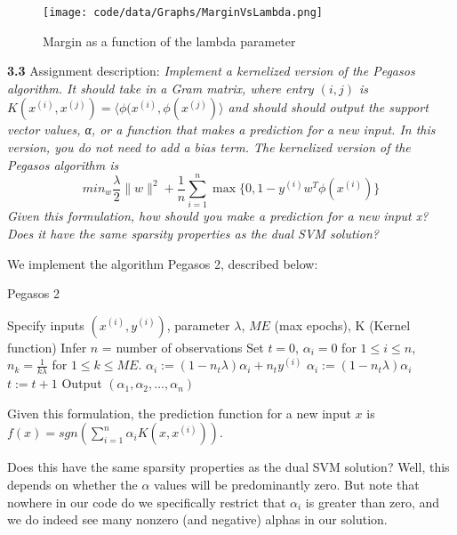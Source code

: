 \documentclass[10pt]{article}
\newcommand{\ds}{\displaystyle}
\begin{document}
\begin{figure}[!ht]
\texttt{[image: code/data/Graphs/MarginVsLambda.png]}
\caption{Margin as a function of the lambda parameter}
\end{figure}

\medskip

\textbf{3.3} Assignment description: \emph{Implement a kernelized version of the Pegasos algorithm. It should take in a Gram matrix, where entry $\ds (i, j)$ is $\ds K(x^{(i)}, x^{(j)}) = \langle\phi(x^{(i)}, \phi(x^{(j)})\rangle$ and should should output the support vector values, α, or a function
that makes a prediction for a new input. In this version, you do not need to add a bias term. The kernelized version of the Pegasos algorithm is $$\ds min_{w} \frac{\lambda}{2}\|w\|^2 + \frac{1}{n}\sum_{i=1}^n\max\{0, 1-y^{(i)}w^T\phi(x^{(i)})\}$$
Given this formulation, how should you make a prediction for a new input x? Does it have the same
sparsity properties as the dual SVM solution?}

We implement the algorithm Pegasos 2, described below:

\begin{algorithm}
\caption{Pegasos 2}
\begin{algorithmic}[1]
\State Specify inputs $\ds (x^{(i)}, y^{(i)}) $, parameter $\ds\lambda$, $\ds ME$ (max epochs), K (Kernel function)
\State Infer $\ds n$ = number of observations
\State Set $\ds t=0$, $\ds \alpha_i=0$ for $\ds 1\leq i\leq n $, $\ds n_k = \frac{1}{k\lambda}$ for $\ds 1\leq k \leq ME$.
\While{$\ds t < ME$}
\If{$\ds y^{(i)}\left(\sum_{j=1}^n \alpha_j K(x^{(j)}, x^{(i)})\right) <1$}
\State $\ds \alpha_i:= (1-n_t\lambda)\alpha_i + n_ty^{(i)}$
\Else
\State $\ds \alpha_i := (1-n_t\lambda)\alpha_i$
\EndIf{}
\State $\ds t:=t+1$
\EndFor{}
\EndWhile{}
Output $\ds (\alpha_1, \alpha_2, \dots, \alpha_n)$
\EndProcedure
\end{algorithmic}
\end{algorithm}

Given this formulation, the prediction function for a new input $\ds x$ is $\ds f(x) = sgn\left(\sum_{i=1}^n \alpha_iK(x, x^{(i)})\right).$

Does this have the same sparsity properties as the dual SVM solution? Well, this depends on whether the $\ds\alpha$ values will be predominantly zero. But note that nowhere in our code do we specifically restrict that $\ds \alpha_i$ is greater than zero, and we do indeed see many nonzero (and negative) alphas in our solution.
\end{document}
